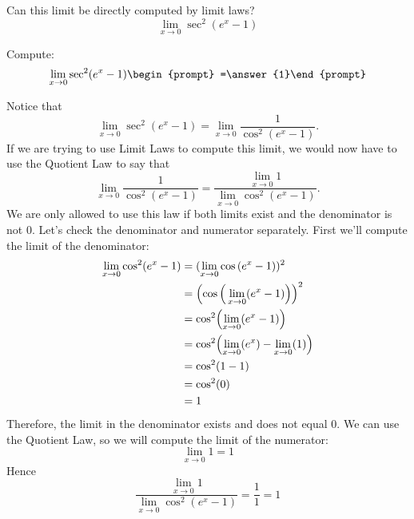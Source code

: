\documentclass{ximera}
\begin{document}
\begin{question}
  Can this limit be directly computed by limit laws?
  \[
  \lim_{x\to 0}\sec^2(e^x-1)
  \]
  \begin{prompt}
  \begin{multipleChoice}
  \end{multipleChoice}
  \begin{question}
    Compute:
    \[
    \lim_{x\to 0}\sec^2(e^x-1)\begin{prompt} =\answer{1}\end{prompt}
    \]
    \begin{feedback}
      Notice that
      \[
      \lim_{x\to 0} \sec^2(e^x-1) = \lim_{x\to 0} \frac{1}{\cos^2(e^x-1)}.
      \]
      If we are trying to use Limit Laws to compute this limit, we
      would now have to use the Quotient Law to say that
      \[
      \lim_{x\to 0} \frac{1}{\cos^2(e^x-1)} = \frac{ \lim_{x\to 0}1}{
        \lim_{x\to 0}\cos^2(e^x-1)}.
      \]
      We are only allowed to use this law if both limits exist and the
      denominator is not $0$.  Let's check the denominator and numerator
      separately. First we'll compute the limit of the denominator:
      \begin{align*}
        \lim_{x\to 0}\cos^2(e^x-1) &= (\lim_{x\to 0}\cos{(e^x-1)})^{2}\\
        &= \Bigl(\cos{\Big(\lim_{x\to 0}(e^x-1)\Bigr)}\Bigr)^{2}\\
        & =\cos^2\Bigl(\lim_{x\to 0}(e^x-1)\Bigr)\\
        &=\cos^2\Bigl(\lim_{x\to 0}(e^x)-\lim_{x\to 0}(1)\Bigr)\\
        &=\cos^2(1-1)\\
        &= \cos^2(0)\\
        &=1
      \end{align*}
      Therefore, the limit in the denominator exists and does not
      equal $0$. We can use the Quotient Law, so we will compute the limit of the numerator:
      \[
      \lim_{x\to 0}1=1
      \]
      Hence
      \[
      \frac{ \lim_{x\to 0}1}{ \lim_{x\to 0}\cos^2(e^x-1)} =
      \frac{1}{1}=1
      \]
    \end{feedback}
  \end{question}
  \end{prompt}
\end{question}
\end{document}

